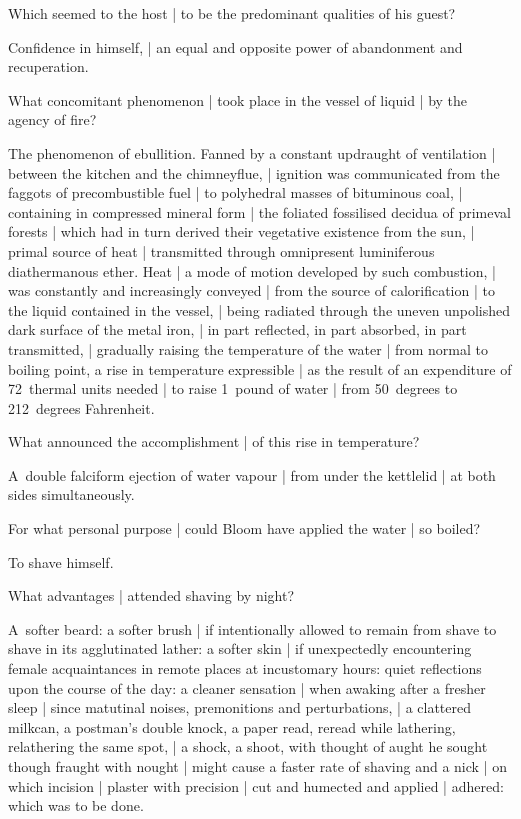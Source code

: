 Which seemed to the host |
to be the predominant qualities of his guest?

\Bloom
Confidence in himself, |
an equal and opposite power of abandonment and recuperation.


What concomitant phenomenon |
took place in the vessel of liquid |
by the agency of fire?

\Science
The phenomenon of ebullition.
Fanned by a constant updraught of ventilation |
between the kitchen and the chimneyflue, |
ignition was communicated
from the faggots of precombustible fuel |
to polyhedral masses of bituminous coal, |
containing in compressed mineral form |
the foliated fossilised decidua of primeval forests |
which had in turn derived their vegetative existence from the sun, |
primal source of heat
 |
transmitted through omnipresent luminiferous diathermanous ether.
Heat
 |
a mode of motion developed by such combustion, |
was constantly and increasingly conveyed |
from the source of calorification |
to the liquid contained in the vessel, |
being radiated through the uneven unpolished dark surface of the metal iron, |
in part reflected,
in part absorbed,
in part transmitted, |
gradually raising the temperature of the water |
from normal to boiling point,
a rise in temperature expressible |
as the result of an expenditure of 72~thermal units needed |
to raise 1~pound of water |
from 50~degrees to 212~degrees Fahrenheit.


What announced the accomplishment |
of this rise in temperature?

\Science
A~double falciform ejection of water vapour |
from under the kettlelid |
at both sides simultaneously.


For what personal purpose |
could Bloom have applied the water |
so boiled?

\Factual
To shave himself.


What advantages |
attended shaving by night?

\Memories
A~softer beard:
a softer brush |
if intentionally allowed
to remain from shave to shave in its agglutinated lather:
a softer skin |
if unexpectedly encountering female acquaintances
in remote places at incustomary hours:
quiet reflections upon the course of the day:
a cleaner sensation |
when awaking after a fresher sleep |
since matutinal noises, premonitions and perturbations, |
a clattered milkcan, a postman's double knock,
a paper read, reread while lathering, relathering the same spot, |
a shock, a shoot,
with thought of aught he sought though fraught with nought |
might cause a faster rate of shaving and a nick |
on which incision |
plaster with precision |
cut and humected and applied |
adhered:
which was to be done.


